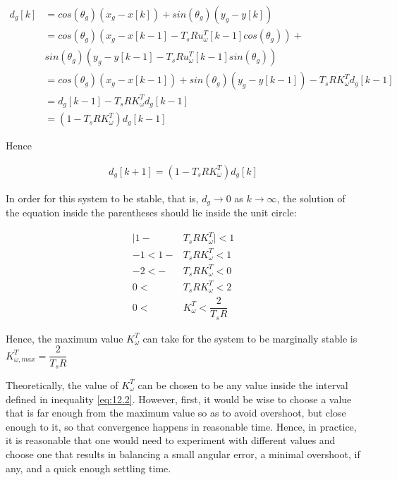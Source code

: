 \begin{align*}
  d_g[k] &= cos(\theta_g) (x_g - x[k]) + sin(\theta_g) (y_g - y[k]) \\
         &= cos(\theta_g) (x_g - x[k-1] - T_s R u_{\omega}^T[k-1] cos(\theta_g)) + \\
         &  sin(\theta_g) (y_g - y[k-1] - T_s R u_{\omega}^T[k-1] sin(\theta_g)) \\
         &= cos(\theta_g) (x_g - x[k-1]) + sin(\theta_g) (y_g - y[k-1]) -T_s R K_{\omega}^T d_g[k-1]  \\
         &= d_g[k-1] - T_s R K_{\omega}^T d_g[k-1]  \\
         &= (1-T_s R K_{\omega}^T)d_g[k-1]
\end{align*}

Hence

\begin{align*}
  d_g[k+1]= (1-T_s R K_{\omega}^T)d_g[k]
\end{align*}

In order for this system to be stable, that is, $d_g \to 0$ as $k \to \infty$,
the solution of the equation inside the parentheses should lie inside the unit
circle:

\begin{align}
  \Big|1 - &T_s R K_{\omega}^T\Big| < 1 \nonumber \\
  -1 < 1 - &T_s R K_{\omega}^T < 1 \nonumber \\
  -2 < - &T_s R K_{\omega}^T < 0 \nonumber \\
   0 <\ &T_s R K_{\omega}^T < 2 \nonumber \\
   0 <\ &K_{\omega}^T < \dfrac{2}{T_s R} \label{eq:12.2}
\end{align}

Hence, the maximum value $K_{\omega}^T$ can take for the system to be marginally
stable is $K_{\omega,max}^T = \dfrac{2}{T_s R}$

Theoretically, the value of $K_{\omega}^T$ can be chosen to be any value inside
the interval defined in inequality \ref{eq:12.2}. However, first, it would be
wise to choose a value that is far enough from the maximum value so as to avoid
overshoot, but close enough to it, so that convergence happens in reasonable
time. Hence, in practice, it is reasonable that one would need to experiment
with different values and choose one that results in balancing a small angular
error, a minimal overshoot, if any, and a quick enough settling time.
